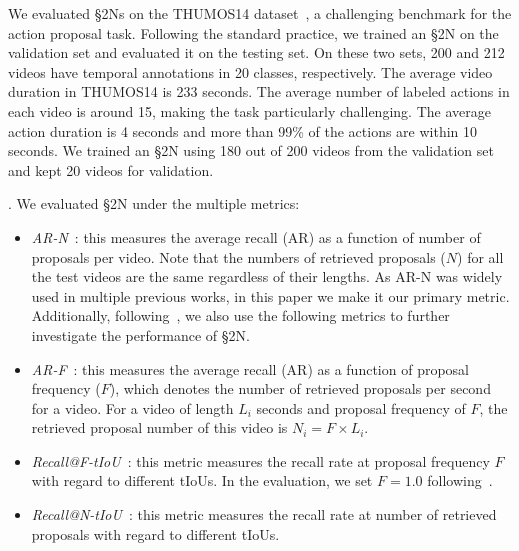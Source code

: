 \documentclass[10pt,journal,compsoc]{IEEEtran}
\begin{document}


 We evaluated \S2Ns on the THUMOS14 dataset~\cite{THUMOS14}, a challenging benchmark for the action proposal task. Following the standard practice, we trained an \S2N on the validation set and evaluated it on the testing set. On these two sets, 200 and 212 videos have temporal annotations in 20 classes, respectively. The average video duration in THUMOS14 is 233 seconds. The average number of labeled actions  in each video is around 15, making the task particularly challenging. The average action duration is 4 seconds and more than 99\% of the actions are within 10 seconds. We trained an \S2N using 180 out of 200 videos from the validation set and kept 20 videos for validation.

. We evaluated \S2N under the multiple metrics:

\begin{itemize}
	\item \textit{AR-N}~\cite{yu2015fast, lin2018BSN,escorcia2016daps,buch2017end}: this measures the average recall (AR) as a function of number of proposals per video. Note that the numbers of retrieved proposals ($N$) for all the test videos are the same regardless of their lengths. As AR-N was widely used in multiple previous works, in this paper we make it our primary metric. Additionally, following~\cite{Gao_2017_ICCV}, we also use the following metrics to further investigate the performance of \S2N.
	\item \textit{AR-F}~\cite{Gao_2017_ICCV}: this measures the average recall (AR) as a function of proposal frequency ($F$), which denotes the number of retrieved proposals per second for a video. For a video of length $L_i$ seconds and proposal frequency of $F$, the retrieved proposal number of this video is $N_i = F\times L_i$. 
	\item \textit{Recall@F-tIoU}~\cite{Gao_2017_ICCV}: this metric measures the recall rate at proposal frequency $F$ with regard to different tIoUs. In the evaluation, we set $F=1.0$ following~\cite{Gao_2017_ICCV}.
	\item \textit{Recall@N-tIoU}~\cite{Gao_2017_ICCV}: this metric measures the recall rate at number of retrieved proposals with regard to different tIoUs. 

\end{itemize}
\end{document}
